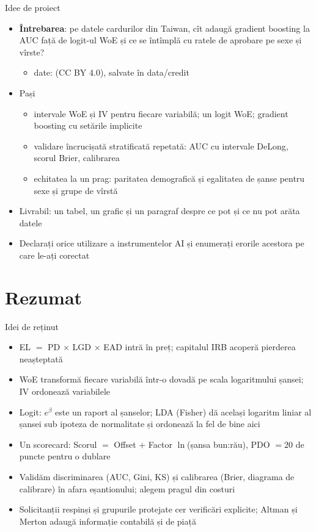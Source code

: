 \begin{frame}{Idee de proiect}
\itemsize{\small}
\begin{itemize}
    \item \textbf{Întrebarea}: pe datele cardurilor din Taiwan, cît adaugă gradient boosting la AUC față de logit-ul WoE și ce se întîmplă cu ratele de aprobare pe sexe și vîrste?
    \begin{itemize}
        \item date:  (CC BY 4.0), salvate în data/credit
    \end{itemize}
    \item Pași
    \begin{itemize}
        \item intervale WoE și IV pentru fiecare variabilă; un logit WoE; gradient boosting cu setările implicite
        \item validare încrucișată stratificată repetată: AUC cu intervale DeLong, scorul Brier, calibrarea
        \item echitatea la un prag: paritatea demografică și egalitatea de șanse pentru sexe și grupe de vîrstă
    \end{itemize}
    \item Livrabil: un tabel, un grafic și un paragraf despre ce pot și ce nu pot arăta datele
    \item Declarați orice utilizare a instrumentelor AI și enumerați erorile acestora pe care le-ați corectat
\end{itemize}
\end{frame}


\section{Rezumat}

\begin{frame}{Idei de reținut}
\itemsize{\small}
\begin{itemize}
    \item EL $=$ PD $\times$ LGD $\times$ EAD intră în preț; capitalul IRB acoperă pierderea neașteptată
    \item WoE transformă fiecare variabilă într-o dovadă pe scala logaritmului șansei; IV ordonează variabilele
    \item Logit: $e^{\beta}$ este un raport al șanselor; LDA (Fisher) dă același logaritm liniar al șansei sub ipoteza de normalitate și ordonează la fel de bine aici
    \item Un scorecard: Scorul $=$ Offset $+$ Factor $\ln$(șansa bun:rău), PDO $= 20$ de puncte pentru o dublare
    \item Validăm discriminarea (AUC, Gini, KS) și calibrarea (Brier, diagrama de calibrare) în afara eșantionului; alegem pragul din costuri
    \item Solicitanții respinși și grupurile protejate cer verificări explicite; Altman și Merton adaugă informație contabilă și de piață
\end{itemize}
\end{frame}

